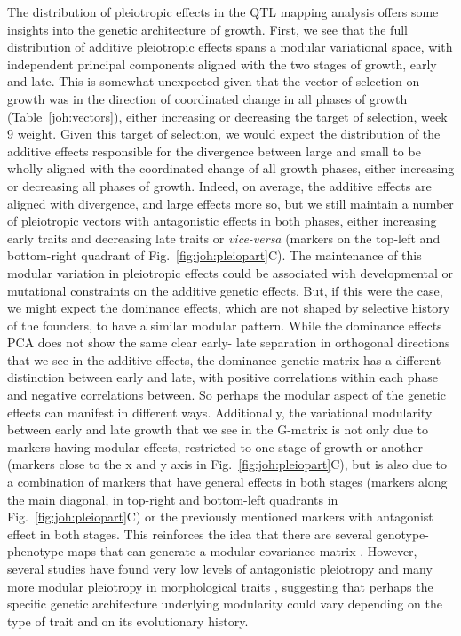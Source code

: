 \begin{refsection}
The distribution of pleiotropic effects in the QTL mapping analysis offers
some insights into the genetic architecture of growth. First, we see that the
full distribution of additive pleiotropic effects spans a modular variational
space, with independent principal components aligned with the two stages of
growth, early and late. This is somewhat unexpected given that the vector of
selection on growth was in the direction of coordinated change in all phases
of growth (Table~\ref{joh:vectors}), either increasing or decreasing the
target of selection, week 9 weight. Given this target of selection, we would
expect the distribution of the additive effects responsible for the divergence
between large and small to be wholly aligned with the coordinated change of
all growth phases, either increasing or decreasing all phases of growth.
Indeed, on average, the additive effects are aligned with divergence, and
large effects more so, but we still maintain a number of pleiotropic vectors
with antagonistic effects in both phases, either increasing early traits and
decreasing late traits or \textit{vice-versa} (markers on the top-left and
bottom-right quadrant of Fig.~\ref{fig:joh:pleiopart}C). The maintenance of
this modular variation in pleiotropic effects could be associated with
developmental or mutational constraints on the additive genetic effects. But,
if this were the case, we might expect the dominance effects, which are not
shaped by selective history of the founders, to have a similar modular
pattern. While the dominance effects PCA does not show the same clear early-
late separation in orthogonal directions that we see in the additive effects,
the dominance genetic matrix has a different distinction between early and
late, with positive correlations within each phase and negative correlations
between. So perhaps the modular aspect of the genetic effects can manifest in
different ways. Additionally, the variational modularity between early and
late growth that we see in the G-matrix is not only due to markers having
modular effects, restricted to one stage of growth or another (markers close
to the x and y axis in Fig.~\ref{fig:joh:pleiopart}C), but is also due to a
combination of markers that have general effects in both stages (markers along
the main diagonal, in top-right and bottom-left quadrants in
Fig.~\ref{fig:joh:pleiopart}C) or the previously mentioned markers with
antagonist effect in both stages. This reinforces the idea that there are
several genotype-phenotype maps that can generate a modular covariance matrix
\parencite{Pavlicev2011-xm}. However, several studies have found very low
levels of antagonistic pleiotropy and many more modular pleiotropy in
morphological traits \parencite{Leamy1999-dm,Leamy2002-nh,Kenney-Hunt2008-bd},
suggesting that perhaps the specific genetic architecture underlying
modularity could vary depending on the type of trait and on its evolutionary
history.


\end{refsection}
